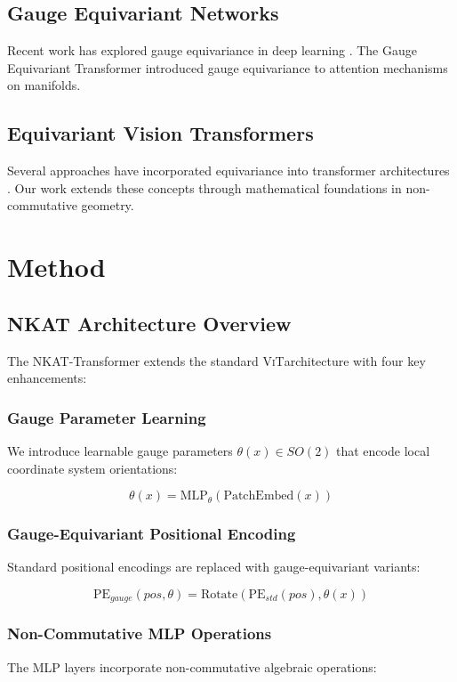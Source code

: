 \documentclass[10pt,twocolumn,letterpaper]{article}
\newcommand{\nkat}{\textsc{NKAT}}
\newcommand{\vit}{\textsc{ViT}}
\begin{document}
\subsection{Gauge Equivariant Networks}
Recent work has explored gauge equivariance in deep learning \cite{cohen2019gauge}. The Gauge Equivariant Transformer \cite{he2021gauge} introduced gauge equivariance to attention mechanisms on manifolds.

\subsection{Equivariant Vision Transformers}
Several approaches have incorporated equivariance into transformer architectures \cite{xu2023e2}. Our work extends these concepts through mathematical foundations in non-commutative geometry.

\section{Method}

\subsection{NKAT Architecture Overview}

The \nkat-Transformer extends the standard \vit architecture with four key enhancements:

\subsubsection{Gauge Parameter Learning}
We introduce learnable gauge parameters $\theta(x) \in SO(2)$ that encode local coordinate system orientations:

\begin{equation}
\theta(x) = \text{MLP}_{\theta}(\text{PatchEmbed}(x))
\end{equation}

\subsubsection{Gauge-Equivariant Positional Encoding}
Standard positional encodings are replaced with gauge-equivariant variants:

\begin{equation}
\text{PE}_{gauge}(pos, \theta) = \text{Rotate}(\text{PE}_{std}(pos), \theta(x))
\end{equation}

\subsubsection{Non-Commutative MLP Operations}
The MLP layers incorporate non-commutative algebraic operations:
\end{document}
